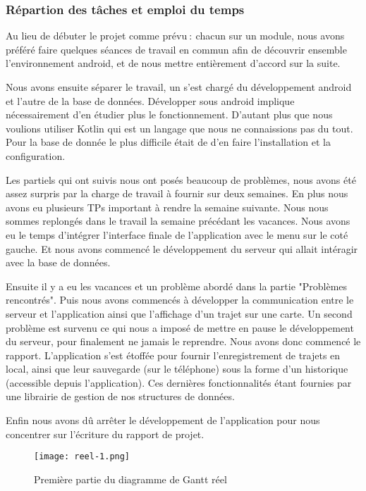 \subsubsection{Répartion des tâches et emploi du temps}
Au lieu de débuter le projet comme prévu$\ :\ $chacun sur un module, nous avons préféré faire quelques séances de travail en commun afin de découvrir ensemble l'environnement android, et de nous mettre entièrement d'accord sur la suite.
\par
Nous avons ensuite séparer le travail, un s'est chargé du développement android et l'autre de la base de données. Développer sous android implique nécessairement d'en étudier plus le fonctionnement. D'autant plus que nous voulions utiliser Kotlin qui est un langage que nous ne connaissions pas du tout.
Pour la base de donnée le plus difficile était de d'en faire l'installation et la configuration.
\par
Les partiels qui ont suivis nous ont posés beaucoup de problèmes, nous avons été assez surpris par la charge de travail à fournir sur deux semaines. En plus nous avons eu plusieurs TPs important à rendre la semaine suivante.
Nous nous sommes replongés dans le travail la semaine précédant les vacances. Nous avons eu le temps d'intégrer l'interface finale de l'application avec le menu sur le coté gauche. Et nous avons commencé le développement du serveur qui allait intéragir avec la base de données.
\par
Ensuite il y a eu les vacances et un problème abordé dans la partie "Problèmes rencontrés". Puis nous avons commencés à développer la communication entre le serveur et l'application ainsi que l'affichage d'un trajet sur une carte. Un second problème est survenu ce qui nous a imposé de mettre en pause le développement du serveur, pour finalement ne jamais le reprendre.
Nous avons donc commencé le rapport. L'application s'est étoffée pour fournir l'enregistrement de trajets en local, ainsi que leur sauvegarde (sur le téléphone) sous la forme d'un historique (accessible depuis l'application).
Ces dernières fonctionnalités étant fournies par une librairie de gestion de nos structures de données.
\par
Enfin nous avons dû arrêter le développement de l'application pour nous concentrer sur l'écriture du rapport de projet.
\vfill
\begin{figure}[!h]
    \begin{center}
        \texttt{[image: reel-1.png]}
        \caption{Première partie du diagramme de Gantt réel}
    \end{center}
\end{figure}
\newpage
